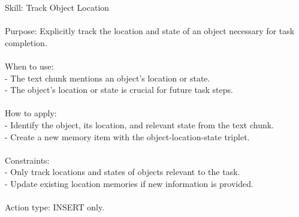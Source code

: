 \begin{center}
\begin{tcolorbox}[
  title={Evolved Skill on ALFWorld - TRACK\_OBJECT\_LOCATION},
  colback=orange!6,
  colframe=orange!75!black,
  coltitle=black
]
{
Skill: Track Object Location \\\\
Purpose: Explicitly track the location and state of an object necessary for task completion. \\\\
When to use: \\
- The text chunk mentions an object's location or state. \\
- The object's location or state is crucial for future task steps. \\\\
How to apply: \\
- Identify the object, its location, and relevant state from the text chunk. \\
- Create a new memory item with the object-location-state triplet. \\\\
Constraints: \\
- Only track locations and states of objects relevant to the task. \\
- Update existing location memories if new information is provided. \\\\
Action type: INSERT only.
}
\label{appendix:case_track_object_location}
\end{tcolorbox}
\end{center}

